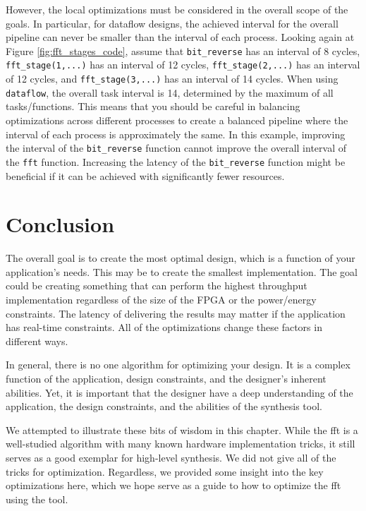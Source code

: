 However, the local optimizations must be considered in the overall scope of the goals. In particular, for dataflow designs, the achieved interval for the overall pipeline can never be smaller than the interval of each process. Looking again at Figure \ref{fig:fft_stages_code}, assume that \lstinline{bit_reverse} has an interval of 8 cycles, \lstinline{fft_stage(1,...)} has an interval of 12 cycles, \lstinline{fft_stage(2,...)} has an interval of 12 cycles, and \lstinline{fft_stage(3,...)} has an interval of 14 cycles. When using \lstinline{dataflow}, the overall task interval is 14, determined by the maximum of all tasks/functions. This means that you should be careful in balancing optimizations across different processes to create a balanced pipeline where the interval of each process is approximately the same. In this example, improving the interval of the \lstinline{bit_reverse} function cannot improve the overall interval of the \lstinline|fft| function. Increasing the latency of the \lstinline{bit_reverse} function might be beneficial if it can be achieved with significantly fewer resources.

\section{Conclusion}
\label{sec:fft_conclusion}

The overall goal is to create the most optimal design, which is a function of your application's needs. This may be to create the smallest implementation. The goal could be creating something that can perform the highest throughput implementation regardless of the size of the FPGA or the power/energy constraints. The latency of delivering the results may matter if the application has real-time constraints. All of the optimizations change these factors in different ways. 

In general, there is no one algorithm for optimizing your design. It is a complex function of the application, design constraints, and the designer's inherent abilities. Yet, it is important that the designer have a deep understanding of the application, the design constraints, and the abilities of the synthesis tool. 

We attempted to illustrate these bits of wisdom in this chapter. While the \gls{fft} is a well-studied algorithm with many known hardware implementation tricks, it still serves as a good exemplar for high-level synthesis. We did not give all of the tricks for optimization. %
Regardless, we provided some insight into the key optimizations here, which we hope serve as a guide to how to optimize the \gls{fft} using the \VHLS tool.

